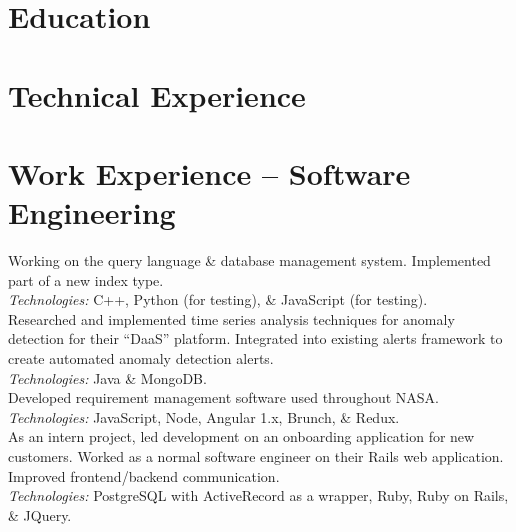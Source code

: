 \documentclass[11pt,letter,sans]{moderncv}
\begin{document}
\makecvtitle
\vspace{-40pt}
\section{Education}

\section{Technical Experience}

\section{Work Experience -- Software Engineering}
Working on the query language \& database management system.
Implemented part of a new index type.
\\
\textit{Technologies:} C++, Python (for testing), \& JavaScript (for testing).
\\
Researched and implemented time series analysis techniques for anomaly detection for their ``DaaS'' platform. Integrated into existing alerts framework to create automated anomaly detection alerts.
\\
\textit{Technologies:} Java \& MongoDB.
\\
Developed requirement management software used throughout NASA.
\\
\textit{Technologies:} JavaScript, Node, Angular 1.x, Brunch, \& Redux.
\\
As an intern project, led development on an onboarding application for new customers.
Worked as a normal software engineer on their Rails web application.
Improved frontend/backend communication.
\\
\textit{Technologies:} PostgreSQL with ActiveRecord as a wrapper, Ruby, Ruby on Rails, \& JQuery.
\end{document}
